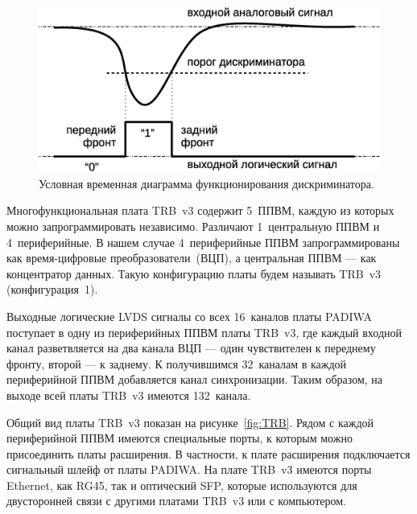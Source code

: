 \begin{figure}
\includegraphics[width=1.0\textwidth]{pictures/6_Discrimination_rus.eps}
\caption{Условная временная диаграмма функционирования дискриминатора.}
\label{fig:Discrimination}
\end{figure}

Многофункциональная плата TRB~v3 содержит 5~ППВМ, каждую из которых можно запрограммировать независимо. Различают 1~центральную ППВМ и 4~периферийные. В нашем случае 4~периферийные ППВМ запрограммированы как время-цифровые преобразователи~(ВЦП), а центральная ППВМ --- как концентратор данных. Такую конфигурацию платы будем называть TRB~v3 (конфигурация~1).

Выходные логические LVDS сигналы со всех 16~каналов платы PADIWA поступает в одну из периферийных ППВМ платы TRB~v3, где каждый входной канал разветвляется на два канала ВЦП --- один чувствителен к переднему фронту, второй --- к заднему. К получившимся 32~каналам в каждой периферийной ППВМ добавляется канал синхронизации. Таким образом, на выходе всей платы TRB~v3 имеются 132~канала.

Общий вид платы TRB~v3 показан на рисунке~\ref{fig:TRB}. Рядом с каждой периферийной ППВМ имеются специальные порты, к которым можно присоединить платы расширения. В частности, к плате расширения подключается сигнальный шлейф от платы PADIWA. На плате TRB~v3 имеются порты Ethernet, как RG45, так и оптический SFP, которые используются для двусторонней связи с другими платами TRB~v3 или с компьютером.

